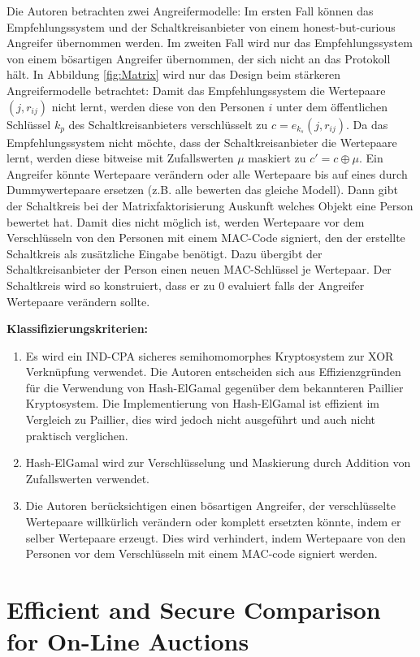 Die Autoren betrachten zwei Angreifermodelle: Im ersten Fall können das Empfehlungssystem und der Schaltkreisanbieter von einem honest-but-curious Angreifer übernommen werden. Im zweiten Fall wird nur das Empfehlungssystem von einem bösartigen Angreifer übernommen, der sich nicht an das Protokoll hält. In Abbildung \ref{fig:Matrix} wird nur das Design beim stärkeren Angreifermodelle betrachtet:
Damit das Empfehlungssystem die Wertepaare $(j,r_{ij})$ nicht lernt, werden diese von den Personen $i$ unter dem öffentlichen Schlüssel $k_p$ des Schaltkreisanbieters verschlüsselt zu $c=e_{k_s}(j,r_{ij})$. Da das Empfehlungssystem nicht möchte, dass der Schaltkreisanbieter die Wertepaare lernt, werden diese bitweise mit Zufallswerten $\mu$ maskiert zu $c' = c\oplus\mu$. Ein Angreifer könnte Wertepaare verändern oder alle Wertepaare bis auf eines durch Dummywertepaare ersetzen (z.B. alle bewerten das gleiche Modell). Dann gibt der Schaltkreis bei der Matrixfaktorisierung Auskunft welches Objekt eine Person bewertet hat. Damit dies nicht möglich ist, werden Wertepaare vor dem Verschlüsseln von den Personen mit einem MAC-Code signiert, den der erstellte Schaltkreis als zusätzliche Eingabe benötigt. Dazu übergibt der Schaltkreisanbieter der Person einen neuen MAC-Schlüssel je Wertepaar. Der Schaltkreis wird so konstruiert, dass er zu $0$ evaluiert falls der Angreifer Wertepaare verändern sollte.

\textbf{Klassifizierungskriterien:}
\begin{enumerate}
	\item Es wird ein IND-CPA sicheres semihomomorphes Kryptosystem zur XOR Verknüpfung verwendet. Die Autoren entscheiden sich aus Effizienzgründen für die Verwendung von Hash-ElGamal gegenüber dem bekannteren Paillier Kryptosystem. Die Implementierung von Hash-ElGamal ist effizient im Vergleich zu Paillier, dies wird jedoch nicht ausgeführt und auch nicht praktisch verglichen.
	\item Hash-ElGamal wird zur Verschlüsselung und Maskierung durch Addition von Zufallswerten verwendet.
	\item Die Autoren berücksichtigen einen bösartigen Angreifer, der verschlüsselte Wertepaare willkürlich verändern oder komplett ersetzten könnte, indem er selber Wertepaare erzeugt. Dies wird verhindert, indem Wertepaare von den Personen vor dem Verschlüsseln mit einem MAC-code signiert werden.
\end{enumerate}

\section[Efficient and Secure Comparison for On-Line Auctions \cite{damgaard2007efficient}]{\texorpdfstring{Efficient and Secure Comparison for On-Line Auctions\\ \cite{damgaard2007efficient}}{Efficient and Secure Comparison for On-Line Auctions \cite{damgaard2007efficient}}}
\label{dgk}

